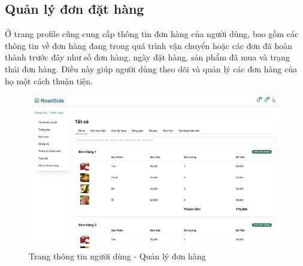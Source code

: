 \subsection{Quản lý đơn đặt hàng}
Ở trang profile cũng cung cấp thông tin đơn hàng của người dùng, bao gồm các thông tin về đơn hàng đang trong quá trình vận chuyển hoặc các đơn đã hoàn thành trước đây như số đơn hàng, ngày đặt hàng, sản phẩm đã mua và trạng thái đơn hàng. Điều này giúp người dùng theo dõi và quản lý các đơn hàng của họ một cách thuận tiện.
    \begin{figure}[H]
        \centering
        \includegraphics[width=\linewidth] {Images/UI/client order.png}
        \vspace{1em}
        \caption{Trang thông tin người dùng - Quản lý đơn hàng}
    \end{figure}
